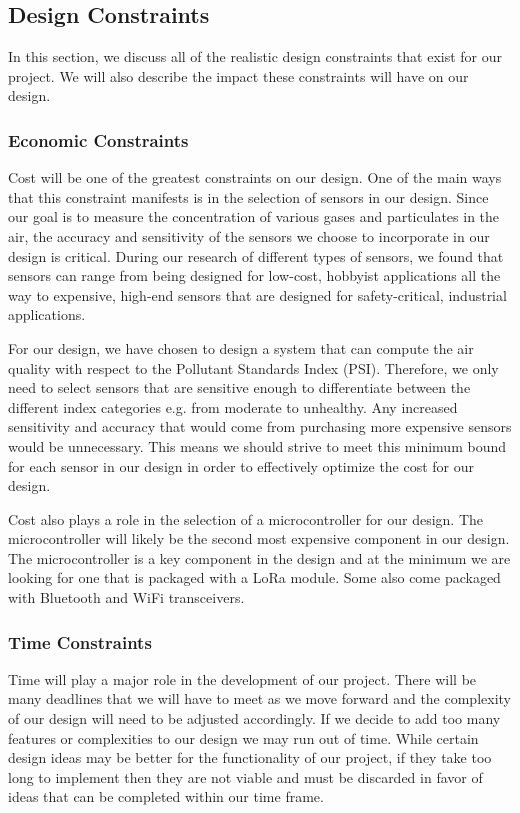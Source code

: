 \subsection{Design Constraints}
In this section, we discuss all of the realistic design constraints that exist for our project. We will also describe the impact these constraints will have on our design.

\subsubsection{Economic Constraints}
Cost will be one of the greatest constraints on our design. One of the main ways that this constraint manifests is in the selection of sensors in our design. Since our goal is to measure the concentration of various gases and particulates in the air, the accuracy and sensitivity of the sensors we choose to incorporate in our design is critical. During our research of different types of sensors, we found that sensors can range from being designed for low-cost, hobbyist applications all the way to expensive, high-end sensors that are designed for safety-critical, industrial applications. 

For our design, we have chosen to design a system that can compute the air quality with respect to the Pollutant Standards Index (PSI). Therefore, we only need to select sensors that are sensitive enough to differentiate between the different index categories e.g. from moderate to unhealthy. Any increased sensitivity and accuracy that would come from purchasing more expensive sensors would be unnecessary. This means we should strive to meet this minimum bound for each sensor in our design in order to effectively optimize the cost for our design.

Cost also plays a role in the selection of a microcontroller for our design. The microcontroller will likely be the second most expensive component in our design. The microcontroller is a key component in the design and at the minimum we are looking for one that is packaged with a LoRa module. Some also come packaged with Bluetooth and WiFi transceivers.

\subsubsection{Time Constraints}
Time will play a major role in the development of our project. There will be many deadlines that we will have to meet as we move forward and the complexity of our design will need to be adjusted accordingly. If we decide to add too many features or complexities to our design we may run out of time. While certain design ideas may be better for the functionality of our project, if they take too long to implement then they are not viable and must be discarded in favor of ideas that can be completed within our time frame.

